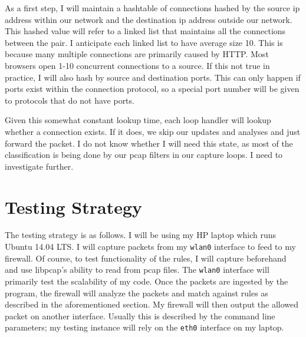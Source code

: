 \documentclass[12pt]{article}
\begin{document}
As a first step, I will maintain a hashtable of connections hashed by
the source ip address within our network and the destination ip address
outside our network.
This hashed value will refer to a linked list that maintains all the 
connections between the pair.
I anticipate each linked list to have average size 10.
This is because many multiple connections are primarily caused by HTTP.
Most browsers open 1-10 concurrent connections to a source.
If this not true in practice, I will also hash by source and destination ports.
This can only happen if ports exist within the connection protocol, so
a special port number will be given to protocols that do not have ports. \par

Given this somewhat constant lookup time, each loop handler will lookup
whether a connection exists. 
If it does, we skip our updates and analyses and just forward the packet.
I do not know whether I will need this state, as most of the classification
is being done by our pcap filters in our capture loops.
I need to investigate further.

\section{Testing Strategy}

The testing strategy is as follows. 
I will be using my HP laptop which runs Ubuntu 14.04 LTS.
I will capture packets from my \texttt{wlan0} interface to feed to my firewall.
Of course, to test functionality of the rules, I will capture beforehand and
use libpcap's ability to read from pcap files. 
The \texttt{wlan0} interface will primarily test the scalability of my code.
Once the packets are ingested by the program,
the firewall will analyze the packets and match against rules
as described in the aforementioned section.
My firewall will then output the allowed packet on another interface.
Usually this is described by the command line parameters;
my testing instance will rely on the \texttt{eth0} interface on my laptop. \par
\end{document}
